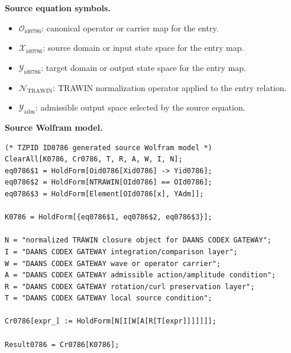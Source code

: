 \begin{minipage}[t]{0.49\linewidth}
\begingroup
\small
\raggedright
\textbf{Source equation symbols.}\par
\begin{itemize}[leftmargin=1.35em,itemsep=1pt,topsep=1pt,parsep=0pt]
    \item $\mathcal{O}_{\mathrm{id0786}}$: canonical operator or carrier map for the entry.
    \item $\mathcal{X}_{\mathrm{id0786}}$: source domain or input state space for the entry map.
    \item $\mathcal{Y}_{\mathrm{id0786}}$: target domain or output state space for the entry map.
    \item $\mathcal{N}_{\mathrm{TRAWIN}}$: TRAWIN normalization operator applied to the entry relation.
    \item $\mathcal{Y}_{\mathrm{adm}}$: admissible output space selected by the source equation.
\end{itemize}
\endgroup
\end{minipage}\hfill
\begin{minipage}[t]{0.47\linewidth}
\begingroup
\scriptsize
\raggedright
\textbf{Source Wolfram model.}\par
\begin{Verbatim}[fontsize=\tiny,breaklines=true,breakanywhere=true]
(* TZPID ID0786 generated source Wolfram model *)
ClearAll[K0786, Cr0786, T, R, A, W, I, N];
eq0786$1 = HoldForm[Oid0786[Xid0786] -> Yid0786];
eq0786$2 = HoldForm[NTRAWIN[OId0786] == OId0786];
eq0786$3 = HoldForm[Element[OId0786[x], YAdm]];

K0786 = HoldForm[{eq0786$1, eq0786$2, eq0786$3}];

N = "normalized TRAWIN closure object for DAANS CODEX GATEWAY";
I = "DAANS CODEX GATEWAY integration/comparison layer";
W = "DAANS CODEX GATEWAY wave or operator carrier";
A = "DAANS CODEX GATEWAY admissible action/amplitude condition";
R = "DAANS CODEX GATEWAY rotation/curl preservation layer";
T = "DAANS CODEX GATEWAY local source condition";

Cr0786[expr_] := HoldForm[N[I[W[A[R[T[expr]]]]]]];

Result0786 = Cr0786[K0786];
\end{Verbatim}
\endgroup
\end{minipage}

